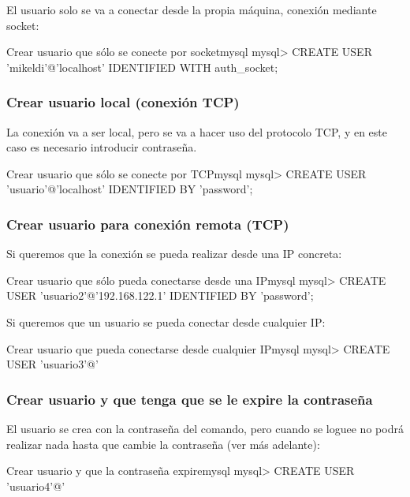 El usuario solo se va a conectar desde la propia máquina, conexión mediante socket:

\begin{mycode}{Crear usuario que sólo se conecte por socket}{mysql}{}
mysql> CREATE USER 'mikeldi'@'localhost' IDENTIFIED WITH auth_socket;
\end{mycode}


\subsubsection*{Crear usuario local (conexión TCP)}
La conexión va a ser local, pero se va a hacer uso del protocolo TCP, y en este caso es necesario introducir contraseña.

\begin{mycode}{Crear usuario que sólo se conecte por TCP}{mysql}{}
mysql> CREATE USER 'usuario'@'localhost' IDENTIFIED BY 'password';
\end{mycode}


\subsubsection*{Crear usuario para conexión remota (TCP)}
Si queremos que la conexión se pueda realizar desde una IP concreta:

\begin{mycode}{Crear usuario que sólo pueda conectarse desde una IP}{mysql}{}
mysql> CREATE USER 'usuario2'@'192.168.122.1' IDENTIFIED BY 'password';
\end{mycode}

Si queremos que un usuario se pueda conectar desde cualquier IP:

\begin{mycode}{Crear usuario que pueda conectarse desde cualquier IP}{mysql}{}
mysql> CREATE USER 'usuario3'@'%
\end{mycode}


\subsubsection*{Crear usuario y que tenga que se le expire la contraseña}
El usuario se crea con la contraseña del comando, pero cuando se loguee no podrá realizar nada hasta que cambie la contraseña (ver más adelante):

\begin{mycode}{Crear usuario y que la contraseña expire}{mysql}{{\small }}
mysql> CREATE USER 'usuario4'@'%
\end{mycode}

